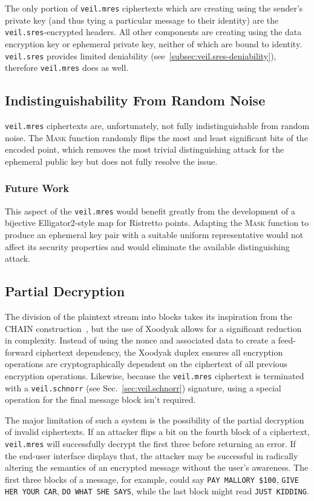 The only portion of \texttt{veil.mres} ciphertexts which are creating using the sender's private key (and thus tying
a particular message to their identity) are the \texttt{veil.sres}-encrypted headers.
All other components are creating using the data encryption key or ephemeral private key, neither of which are bound
to identity.
\texttt{veil.sres} provides limited deniability (see~\ref{subsec:veil.sres-deniability}), therefore \texttt{veil.mres}
does as well.

\subsection{Indistinguishability From Random Noise}\label{subsec:veil.mres-indistinguishability}

\texttt{veil.mres} ciphertexts are, unfortunately, not fully indistinguishable from random noise.
The \textsc{Mask} function randomly flips the most and least significant bits of the encoded point, which removes the
most trivial distinguishing attack for the ephemeral public key but does not fully resolve the issue.

\subsubsection{Future Work}

This aspect of the \texttt{veil.mres} would benefit greatly from the development of a bijective Elligator2-style map
for Ristretto points.
Adapting the \textsc{Mask} function to produce an ephemeral key pair with a suitable uniform representative would not
affect its security properties and would eliminate the available distinguishing attack.

\subsection{Partial Decryption}\label{subsec:veil.mres-partial-decryption}

The division of the plaintext stream into blocks takes its inspiration from the CHAIN construction~\cite{hoang2015}, but
the use of Xoodyak allows for a significant reduction in complexity.
Instead of using the nonce and associated data to create a feed-forward ciphertext dependency, the Xoodyak duplex
ensures all encryption operations are cryptographically dependent on the ciphertext of all previous encryption
operations.
Likewise, because the \texttt{veil.mres} ciphertext is terminated with a \texttt{veil.schnorr} (see
Sec.~\ref{sec:veil.schnorr}) signature, using a special operation for the final message block isn't required.

The major limitation of such a system is the possibility of the partial decryption of invalid ciphertexts.
If an attacker flips a bit on the fourth block of a ciphertext, \texttt{veil.mres} will successfully decrypt the first
three before returning an error.
If the end-user interface displays that, the attacker may be successful in radically altering the semantics of an
encrypted message without the user's awareness.
The first three blocks of a message, for example, could say \texttt{PAY MALLORY \$100}, \texttt{GIVE HER YOUR CAR},
\texttt{DO WHAT SHE SAYS}, while the last block might read \texttt{JUST KIDDING}.
